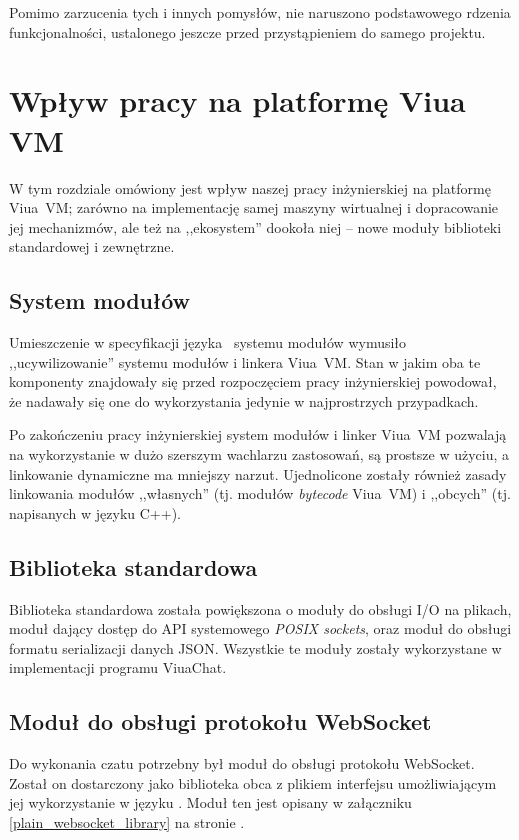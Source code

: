 Pomimo zarzucenia tych i innych pomysłów, nie naruszono podstawowego rdzenia
 funkcjonalności, ustalonego jeszcze przed przystąpieniem do samego projektu.

\section{Wpływ pracy na platformę Viua VM}

W tym rozdziale omówiony jest wpływ naszej pracy inżynierskiej na platformę
Viua~VM; zarówno na implementację samej maszyny wirtualnej i dopracowanie jej
mechanizmów, ale też na ,,ekosystem'' dookoła niej -- nowe moduły biblioteki
standardowej i zewnętrzne.

\subsection{System modułów}

Umieszczenie w specyfikacji języka \ViuAct\ systemu modułów wymusiło
,,ucywilizowanie'' systemu modułów i linkera Viua~VM. Stan w jakim oba te
komponenty znajdowały się przed rozpoczęciem pracy inżynierskiej powodował, że
nadawały się one do wykorzystania jedynie w najprostrzych przypadkach.

Po zakończeniu pracy inżynierskiej system modułów i linker Viua~VM pozwalają na
wykorzystanie w dużo szerszym wachlarzu zastosowań, są prostsze w użyciu, a
linkowanie dynamiczne ma mniejszy narzut. Ujednolicone zostały również zasady
linkowania modułów ,,własnych'' (tj. modułów \emph{bytecode} Viua~VM) i
,,obcych'' (tj. napisanych w języku C++).

\subsection{Biblioteka standardowa}

Biblioteka standardowa została powiększona o moduły do obsługi I/O na plikach,
moduł dający dostęp do API systemowego \emph{POSIX sockets}, oraz moduł do
obsługi formatu serializacji danych JSON.
Wszystkie te moduły zostały wykorzystane w implementacji programu ViuaChat.

\subsection{Moduł do obsługi protokołu WebSocket}

Do wykonania czatu potrzebny był moduł do obsługi protokołu WebSocket.
Został on dostarczony jako biblioteka obca z plikiem interfejsu umożliwiającym
jej wykorzystanie w języku \ViuAct. Moduł ten jest opisany w załączniku
\ref{plain_websocket_library} na stronie \pageref{plain_websocket_library}.
